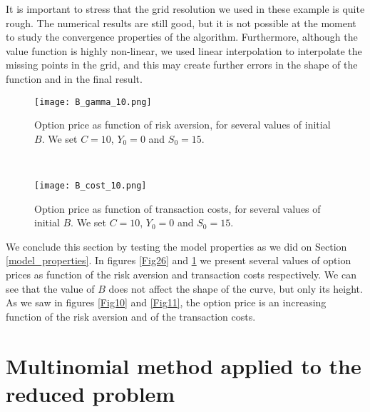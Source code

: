 It is important to stress that the grid resolution we used in these example is quite rough. The numerical results are still good, but it is not possible at the moment 
to study the convergence properties of the algorithm. 
Furthermore, although the value function is highly non-linear, we used linear interpolation to interpolate the missing points in the grid, and this may create further errors in the shape
of the function and in the final result.

\begin{figure}[t!]
 \begin{minipage}[b]{0.5\linewidth}
   \centering
   \texttt{[image: B\_gamma\_10.png]}
   \caption{Option price as function of risk aversion, for several values of initial $B$. We set $C=10$, $Y_0=0$ and $S_0=15$.}
   \label{Fig26} 
 \end{minipage}
 \ \hspace{2mm} \hspace{3mm} \
 \begin{minipage}[b]{0.5\linewidth}
   \texttt{[image: B\_cost\_10.png]}
   \caption{Option price as function of transaction costs, for several values of initial $B$. We set $C=10$, $Y_0=0$ and $S_0=15$.}
   \label{Fig25}
 \end{minipage}
\end{figure}  

We conclude this section by testing the model properties as we did on Section \ref{model_properties}. 
In figures \ref{Fig26} and \ref{Fig25} we present several values of option prices as function of the risk aversion and transaction costs respectively.  
We can see that the value of $B$ does not affect the shape of the curve, but only its height. 
As we saw in figures \ref{Fig10} and \ref{Fig11}, the option price is an increasing function of the risk aversion and of the transaction costs.


\section{Multinomial method applied to the reduced problem}

